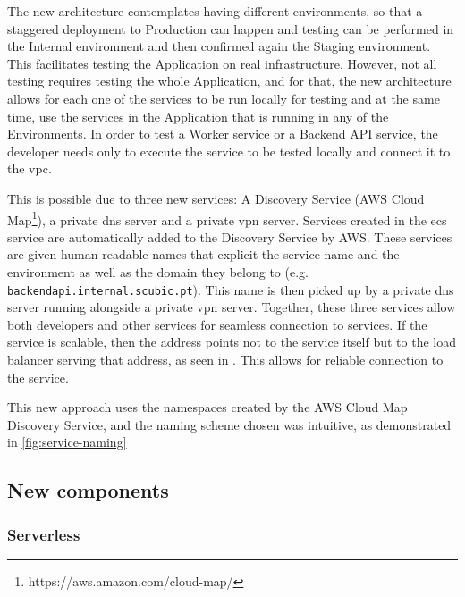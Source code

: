 The new architecture contemplates having different environments, so that a staggered deployment to Production can happen and testing can be performed in the Internal environment and then confirmed again the Staging environment. This facilitates testing the Application on real infrastructure. However, not all testing requires testing the whole Application, and for that, the new architecture allows for each one of the services to be run locally for testing and at the same time, use the services in the Application that is running in any of the Environments. In order to test a Worker service or a Backend API service, the developer needs only to execute the service to be tested locally and connect it to the \gls{vpc}.



This is possible due to three new services: A Discovery Service (AWS Cloud Map\footnote{https://aws.amazon.com/cloud-map/\label{foot:cloudmap}}), a private \gls{dns} server and a private \gls{vpn} server.
Services created in the \gls{ecs} service are automatically added to the Discovery Service by AWS. These services are given human-readable names that explicit the service name and the environment as well as the domain they belong to (e.g. \texttt{backendapi.internal.scubic.pt}). This name is then picked up by a private \gls{dns} server running alongside a private \gls{vpn} server. Together, these three services allow both developers and other services for seamless connection to services. If the service is scalable, then the address points not to the service itself but to the load balancer serving that address, as seen in . This allows for reliable connection to the service.

This new approach uses the namespaces created by the AWS Cloud Map Discovery Service, and the naming scheme chosen was intuitive, as demonstrated in \cref{fig:service-naming}



\subsection{New components}\label{methodology:ss:new-components-new-arch}

\subsubsection{Serverless}\label{methodology:sss:serverless}

